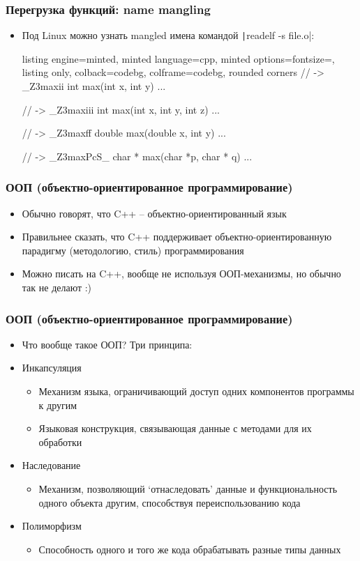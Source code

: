 \documentclass[10pt]{beamer}
\begin{document}
\begin{frame}[fragile]
\frametitle{Перегрузка функций: name mangling}
\begin{itemize}
\item Под Linux можно узнать mangled имена командой \texttt|readelf -s file.o|:
\begin{tcblisting}{listing engine=minted, minted language=cpp, minted options={fontsize=\scriptsize}, listing only, colback=codebg, colframe=codebg, rounded corners}
// -> _Z3maxii
int max(int x, int y) { ... }

// -> _Z3maxiii
int max(int x, int y, int z) { ... }

// -> _Z3maxff
double max(double x, int y) { ... }

// -> _Z3maxPcS_
char * max(char *p, char * q) { ... }
\end{tcblisting}
\end{itemize}
\end{frame}

\begin{frame}[fragile]
\frametitle{ООП (объектно-ориентированное программирование)}
\begin{itemize}
\item Обычно говорят, что C++ -- объектно-ориентированный язык
\pause
\item Правильнее сказать, что C++ поддерживает объектно-ориентированную парадигму (методологию, стиль) программирования
\pause
\item Можно писать на C++, вообще не используя ООП-механизмы, но обычно так не делают :)
\end{itemize}
\end{frame}

\begin{frame}[fragile]
\frametitle{ООП (объектно-ориентированное программирование)}
\begin{itemize}
\item Что вообще такое ООП? \pause Три принципа:
\pause
\item Инкапсуляция
\begin{itemize}
\item Механизм языка, ограничивающий доступ одних компонентов программы к другим
\item Языковая конструкция, связывающая данные с методами для их обработки
\end{itemize}
\pause
\item Наследование
\begin{itemize}
\item Механизм, позволяющий `отнаследовать' данные и функциональность одного объекта другим, способствуя переиспользованию кода
\end{itemize}
\pause
\item Полиморфизм
\begin{itemize}
\item Способность одного и того же кода обрабатывать разные типы данных
\end{itemize}
\end{itemize}
\end{frame}
\end{document}
